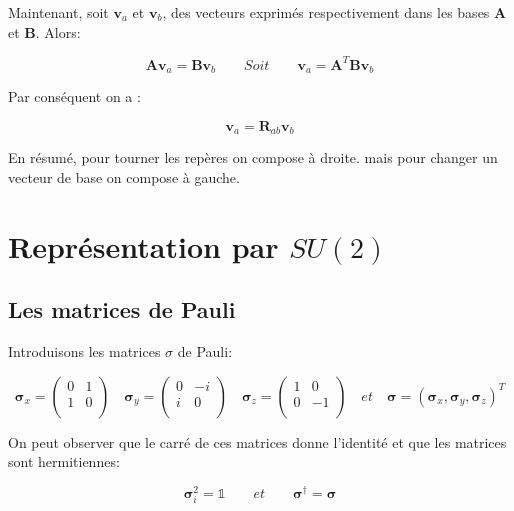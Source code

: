 \documentclass[12pt,a4paper]{article}
\newcommand{\unit}
{
\bm{\mathds{1}}
}
\begin{document}
	Maintenant, soit $\bm{v}_{a}$ et $\bm{v}_{b}$, des vecteurs exprimés respectivement dans les bases $\bm{A}$ et $\bm{B}$. Alors:
	
	\[
	\bm{A} \bm{v}_{a} =\bm{B} \bm{v}_{b} \quad\quad Soit\quad \quad \bm{v}_{a} =\bm{A}^T \bm{B} \bm{v}_{b}
	\]
	
	Par conséquent on a :
	
	\[
	\boxed{\bm{v}_{a} = \bm{R}_{ab} \bm{v}_{b}} 
	\]
	
	En résumé, pour tourner les repères on compose à droite. mais pour changer un vecteur de base on compose à gauche.
	
\newpage
\section{Représentation par $SU(2)$}
	\subsection{Les matrices de Pauli}
	 Introduisons les matrices $\sigma$ de Pauli:
	
	\[
	\bm{\sigma}_x=\begin{pmatrix}
	0&1\\
	1&0\\
	\end{pmatrix}\quad
	\bm{\sigma}_y=\begin{pmatrix}
	0&-i\\
	i&0\\
	\end{pmatrix}\quad
	\bm{\sigma}_z=\begin{pmatrix}
	1&0\\
	0&-1\\
	\end{pmatrix}\quad et\quad \bm{\sigma}=(\bm{\sigma}_x,\bm{\sigma}_y,\bm{\sigma}_z)^T
	\]
	
	On peut observer que le carré de ces matrices donne l'identité et que les matrices sont hermitiennes:  
	
	\[
		\boxed{\bm{\sigma}_i^2=\unit}\quad\quad et \quad\quad \boxed{\bm{\sigma}^{\dagger}=\bm{\sigma}}
	\]
	
\end{document}
